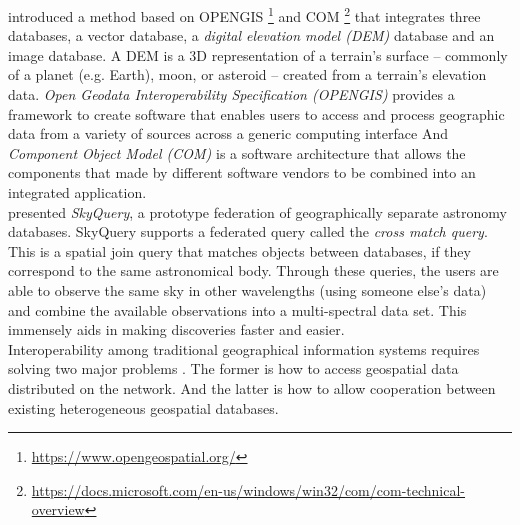 \documentclass[12pt,a4paper]{report}
\newcommand{\term}{\textit}
\newcommand{\acr}{\MakeUppercase}
\begin{document}
	\citet{Jian} introduced a method based on \acr{opengis} 
	\footnote{ \url{https://www.opengeospatial.org/}} and \acr{com} 
	\footnote{ \url{https://docs.microsoft.com/en-us/windows/win32/com/com-technical-overview}} 
	that integrates three databases, a vector database, a 
	\term{digital elevation model (\acr{dem})} database and an image database. 
	A \acr{dem} is a 3D representation of a terrain's surface – commonly of a 
	planet (e.g. Earth), moon, or asteroid – created from a terrain's elevation 
	data. \term{Open Geodata Interoperability Specification (\acr{opengis})} 
	provides a framework to create software that enables users to access and 
	process geographic data from a variety of sources across a generic computing 
	interface And \term{Component Object Model (\acr{com})} is a software 
	architecture that allows the components that made by different software 
	vendors to be combined into an integrated application. 
	\\

	\citet{Malik} presented \term{SkyQuery}, a prototype federation of 
	geographically separate astronomy databases. SkyQuery supports a federated 
	query called the \term{cross match query}. This is a spatial join query 
	that matches objects between databases, if they correspond to the same 
	astronomical body. Through these queries, the users are able to observe the 
	same sky in other wavelengths (using someone else’s data) and combine the 
	available observations into a multi-spectral data set. This immensely aids 
	in making discoveries faster and easier.
	\\

	Interoperability among traditional geographical information systems requires solving two major problems \citep{Gong}. The former is how to access geospatial data distributed on the network. And the latter is how to allow cooperation between existing heterogeneous geospatial databases.
	\\

	\renewcommand{\bibname}{References}
	
	
\end{document}
